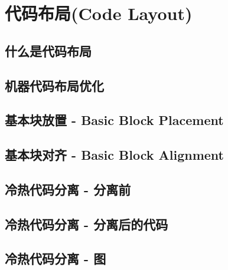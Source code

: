 \section{代码布局(Code Layout)}
\subsection{什么是代码布局}

\subsection{机器代码布局优化}


\subsection{基本块放置 - Basic Block Placement}

\subsection{基本块对齐 - Basic Block Alignment}

\subsection{冷热代码分离 - 分离前}


\subsection{冷热代码分离 - 分离后的代码}

\subsection{冷热代码分离 - 图}
